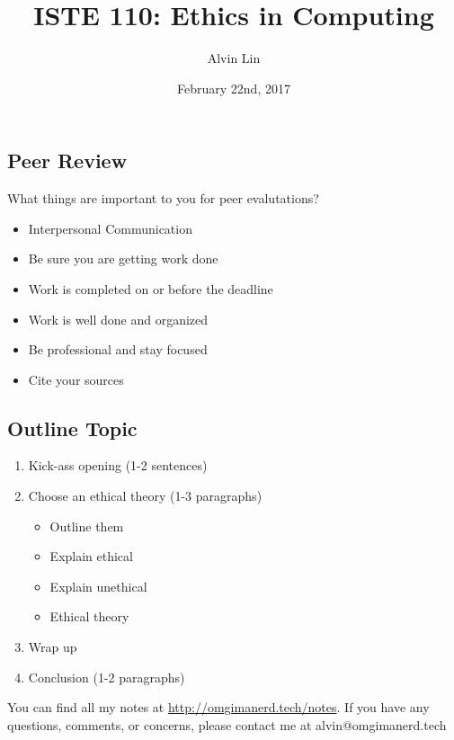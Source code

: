 \documentclass{article}
\title{ISTE 110: Ethics in Computing}
\author{Alvin Lin}
\date{February 22nd, 2017}
\begin{document}
\maketitle

\subsection*{Peer Review}
What things are important to you for peer evalutations?
\begin{itemize}
  \item Interpersonal Communication
  \item Be sure you are getting work done
  \item Work is completed on or before the deadline
  \item Work is well done and organized
  \item Be professional and stay focused
  \item Cite your sources
\end{itemize}

\subsection*{Outline Topic}
\begin{enumerate}
  \item Kick-ass opening (1-2 sentences)
  \item Choose an ethical theory (1-3 paragraphs)
  \begin{itemize}
    \item Outline them
    \item Explain ethical
    \item Explain unethical
    \item Ethical theory
  \end{itemize}
  \item Wrap up
  \item Conclusion (1-2 paragraphs)
\end{enumerate}

\begin{center}
  You can find all my notes at \url{http://omgimanerd.tech/notes}. If you have
  any questions, comments, or concerns, please contact me at
  alvin@omgimanerd.tech
\end{center}
\end{document}
